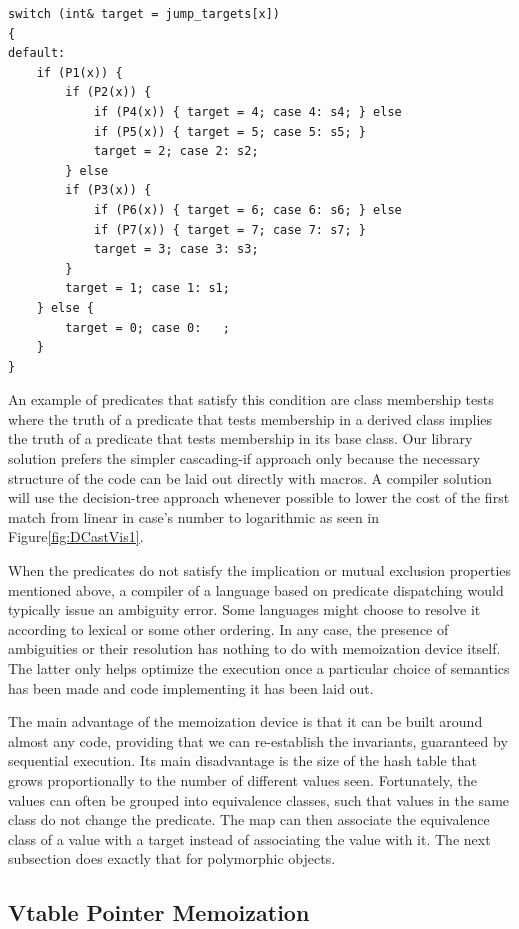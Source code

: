 \documentclass[preprint]{sigplanconf}
\begin{document}
\begin{lstlisting}
switch (int& target = jump_targets[x])
{
default:
    if (P1(x)) {
        if (P2(x)) {
            if (P4(x)) { target = 4; case 4: s4; } else
            if (P5(x)) { target = 5; case 5: s5; } 
            target = 2; case 2: s2;
        } else
        if (P3(x)) {
            if (P6(x)) { target = 6; case 6: s6; } else
            if (P7(x)) { target = 7; case 7: s7; } 
            target = 3; case 3: s3;
        }
        target = 1; case 1: s1;
    } else {
        target = 0; case 0:   ;
    }
}
\end{lstlisting}

\noindent
An example of predicates that satisfy this condition are class membership tests
where the truth of a predicate that tests membership in a derived class implies 
the truth of a predicate that tests membership in its base class. Our library 
solution prefers the simpler cascading-if approach only because the necessary 
structure of the code can be laid out directly with macros. A compiler solution 
will use the decision-tree approach whenever possible to lower the cost of the 
first match from linear in case's number to logarithmic as seen in Figure\ref{fig:DCastVis1}.

When the predicates do not satisfy the implication or mutual exclusion properties 
mentioned above, a compiler of a language based on predicate dispatching would 
typically issue an ambiguity error. Some languages might choose to resolve it 
according to lexical or some other ordering. In any case, the presence of 
ambiguities or their resolution has nothing to do with memoization device 
itself. The latter only helps optimize the execution once a particular choice of 
semantics has been made and code implementing it has been laid out.

The main advantage of the memoization device is that it can be built around 
almost any code, providing that we can re-establish the invariants, guaranteed 
by sequential execution. Its main disadvantage is the size of the hash table 
that grows proportionally to the number of different values seen. Fortunately, 
the values can often be grouped into equivalence classes, such that values in 
the same class do not change the predicate. The map can then associate the 
equivalence class of a value with a target instead of associating the value with 
it. The next subsection does exactly that for polymorphic objects.

\subsection{Vtable Pointer Memoization}
\label{sec:vtblmem}
\end{document}
